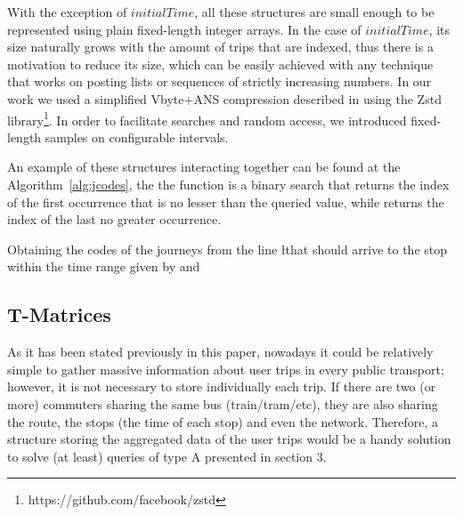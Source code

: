 \documentclass[runningheads]{llncs}
\newcommand{\acumm}{T-Matrices} %
\begin{document}
With the exception of $initialTime$, all these structures are small enough to be represented using plain fixed-length integer arrays. In the case of $initialTime$, its size naturally grows with the amount of trips that are indexed, thus there is a motivation to reduce its size, which can be easily achieved with any technique that works on posting lists or sequences of strictly increasing numbers. In our work we used a simplified Vbyte+ANS compression described in \cite{moffat2017ans} using the Zstd library\footnote{https://github.com/facebook/zstd}. In order to facilitate searches and random access, we introduced fixed-length samples on configurable intervals.

An example of these structures interacting together can be found at the Algorithm~\ref{alg:jcodes}, the the function  is a binary search that returns the index of the first occurrence that is no lesser than the queried value, while  returns the index of the last no greater occurrence.

\begin{algorithm}[H]
 
 
 \caption{Obtaining the codes of the journeys from the line \l that should arrive to the stop \s within the time range given by \ta and \tz}
 \label{alg:jcodes}
\end{algorithm}

\subsection{\acumm}
As it has been stated previously in this paper, nowadays it could be relatively simple to gather massive information about user trips in every public transport; however, it is not necessary to store individually each trip. If there are two (or more) commuters sharing the same bus (train/tram/etc), they are also sharing the route, the stops (the time of each stop) and even the network. Therefore, a structure storing the aggregated data of the user trips would be a handy solution to solve (at least) queries of type A presented in section 3.
\end{document}
